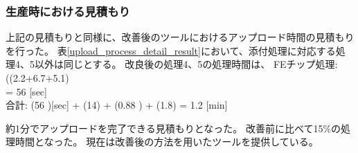 \subsubsection{生産時における見積もり}
上記の見積もりと同様に、改善後のツールにおけるアップロード時間の見積もりを行った。
表\ref{upload_process_detail_result}において、添付処理に対応する処理4、5以外は同じとする。
改良後の処理4、5の処理時間は、
\bbb
{\rm FE}チップ処理: ((2.2+6.7+5.1) \pm {}  \\\nonumber 
= 56   [{\rm sec}]\\
合計: (56  )[\rm{sec}] + (14) + (0.88 ) + (1.8) = 1.2  [{\rm min}]
\eee

約1分でアップロードを完了できる見積もりとなった。
改善前に比べて15$\%$の処理時間となった。
現在は改善後の方法を用いたツールを提供している。

